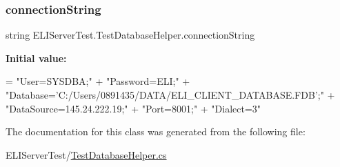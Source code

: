 \subsubsection{\texorpdfstring{connection\+String}{connectionString}}
{\footnotesize\ttfamily string E\+L\+I\+Server\+Test.\+Test\+Database\+Helper.\+connection\+String\hspace{0.3cm}{\ttfamily [private]}}

{\bfseries Initial value\+:}
\begin{DoxyCode}
=
                \textcolor{stringliteral}{"User=SYSDBA;"} +
                \textcolor{stringliteral}{"Password=ELI;"} +
                \textcolor{stringliteral}{"Database='C:/Users/0891435/DATA/ELI\_CLIENT\_DATABASE.FDB';"} +
                \textcolor{stringliteral}{"DataSource=145.24.222.19;"} +
                \textcolor{stringliteral}{"Port=8001;"} +
                \textcolor{stringliteral}{"Dialect=3"}
\end{DoxyCode}


The documentation for this class was generated from the following file\+:\begin{DoxyCompactItemize}
\item 
E\+L\+I\+Server\+Test/\hyperlink{_test_database_helper_8cs}{Test\+Database\+Helper.\+cs}\end{DoxyCompactItemize}
